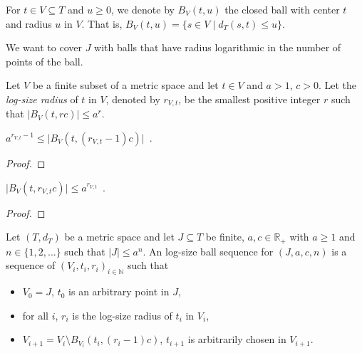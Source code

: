 For $t \in V \subseteq T$ and $u\ge 0$, we denote by $B_V(t, u)$ the closed ball with center $t$ and radius $u$ in $V$.
That is, $B_V(t, u) = \{s \in V \mid d_T(s, t) \le u\}$.

We want to cover $J$ with balls that have radius logarithmic in the number of points of the ball.

\begin{definition}\label{def:logSizeRadius}
  \leanok
Let $V$ be a finite subset of a metric space and let $t \in V$ and $a > 1$, $c > 0$.
Let the \emph{log-size radius} of $t$ in $V$, denoted by $r_{V,t}$, be the smallest positive integer $r$ such that $\vert B_V(t, r c) \vert \le a^{r}$.
\end{definition}


\begin{lemma}\label{lem:card_logSizeRadius_ge}
  \leanok
$a^{r_{V,t}-1} \le \vert B_V(t, (r_{V,t}-1)c) \vert$~.
\end{lemma}

\begin{proof}\leanok

\end{proof}


\begin{lemma}\label{lem:card_logSizeRadius_le}
  \leanok
$\vert B_V(t, r_{V,t}c) \vert \le a^{r_{V,t}}$~.
\end{lemma}

\begin{proof}\leanok

\end{proof}


\begin{definition}\label{def:logSizeBallSequence}
  \leanok
Let $(T,d_T)$ be a metric space and let $J \subseteq T$ be finite, $a,c \in \mathbb R_+$ with $a \ge 1$ and $n \in \{1, 2, ...\}$ such that $|J| \le a^n$.
An log-size ball sequence for $(J, a, c, n)$ is a sequence of $(V_i, t_i, r_i)_{i \in \mathbb{N}}$ such that
\begin{itemize}
  \item $V_0 = J$, $t_0$ is an arbitrary point in $J$,
  \item for all $i$, $r_i$ is the log-size radius of $t_i$ in $V_i$,
  \item $V_{i+1} = V_i \setminus B_{V_i}(t_i, (r_i - 1)c)$, $t_{i+1}$ is arbitrarily chosen in $V_{i+1}$.
\end{itemize}
\end{definition}

